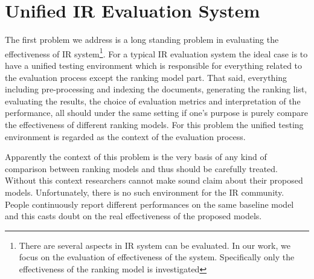 \section{Unified IR Evaluation System}
The first problem we address is a long standing problem in evaluating the 
effectiveness of IR system\footnote{There are several aspects in IR system 
can be evaluated. In our work, we focus on the evaluation of effectiveness 
of the system. Specifically only the effectiveness of the ranking model is 
investigated}. 
For a typical IR evaluation system the ideal case is to have a unified 
testing environment which is responsible for everything related 
to the evaluation process except the ranking model part. That said, everything 
including pre-processing and indexing the documents, generating the ranking 
list, evaluating the results, the choice of evaluation metrics and 
interpretation of the performance, all should under the same setting 
if one's purpose is purely compare the effectiveness of different ranking models.
For this problem the unified testing environment is regarded as the context of 
the evaluation process. 

Apparently the context of this problem is the very basis of any kind of 
comparison between ranking models and thus should be carefully treated. 
Without this context researchers cannot make sound claim about 
their proposed models. Unfortunately, there is no such environment for the 
IR community. People continuously report different performances on the same 
baseline model \cite{Yang:2016:RSI:2970398.2970415} and this casts doubt on 
the real effectiveness of the proposed models.

